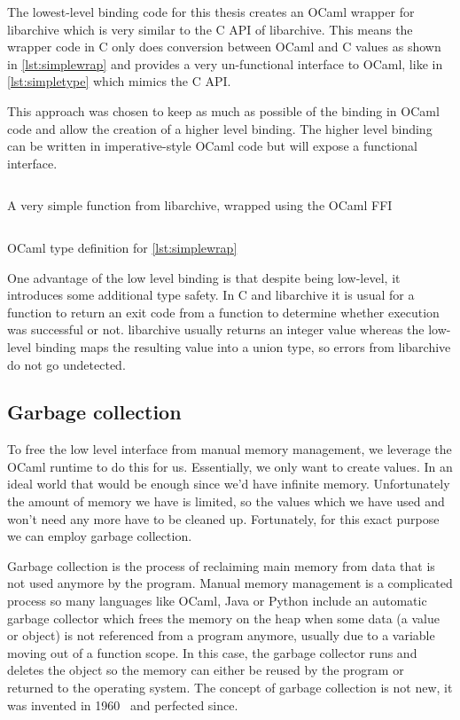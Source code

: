 \documentclass[parskip=half]{scrreprt}
\begin{document}
The lowest-level binding code for this thesis creates an OCaml wrapper for
libarchive which is very similar to the C API of libarchive. This means the
wrapper code in C only does conversion between OCaml and C values as shown in
\autoref{lst:simplewrap} and provides a very un-functional interface to OCaml,
like in \autoref{lst:simpletype} which mimics the C API.

This approach was chosen to keep as much as possible of the binding in OCaml
code and allow the creation of a higher level binding. The higher level binding
can be written in imperative-style OCaml code but will expose a functional
interface.

\begin{listing}[h]
  \inputminted[linenos]{c}{simple-wrap.c}
  \caption{A very simple function from libarchive, wrapped using the OCaml FFI}
  \label{lst:simplewrap}
\end{listing}

\begin{listing}[h]
  \inputminted[linenos]{ocaml}{simple-wrap.ml}
  \caption{OCaml type definition for \autoref{lst:simplewrap}}
  \label{lst:simpletype}
\end{listing}

One advantage of the low level binding is that despite being low-level, it
introduces some additional type safety. In C and libarchive it is usual for a
function to return an exit code from a function to determine whether execution
was successful or not. libarchive usually returns an integer value whereas the
low-level binding maps the resulting value into a union type, so errors from
libarchive do not go undetected.

\subsection{Garbage collection}
\label{sec:gc}

To free the low level interface from manual memory management, we leverage the
OCaml runtime to do this for us. Essentially, we only want to create values. In
an ideal world that would be enough since we'd have infinite memory.
Unfortunately the amount of memory we have is limited, so the values which we
have used and won't need any more have to be cleaned up. Fortunately, for this
exact purpose we can employ garbage collection.

Garbage collection is the process of reclaiming main memory from data that is
not used anymore by the program. Manual memory management is a complicated
process so many languages like OCaml, Java or Python include an automatic
garbage collector which frees the memory on the heap when some data (a value or
object) is not referenced from a program anymore, usually due to a variable
moving out of a function scope. In this case, the garbage collector runs and
deletes the object so the memory can either be reused by the program or
returned to the operating system. The concept of garbage collection is not new,
it was invented in 1960~\cite{mccarthy1960recursive} and perfected since.
\end{document}
